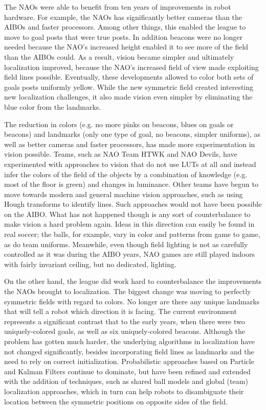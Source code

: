 \documentclass{llncs}
\begin{document}
The NAOs were able to benefit from ten years of improvements in robot hardware.
For example, the NAOs has significantly better cameras than the AIBOs and faster
processors. Among other things, this enabled the league to move to goal posts
that were true posts. In addition beacons were no longer needed because the
NAO's increased height enabled it to see more of the field than the
AIBOs could.
As a result, vision became simpler and ultimately localization improved, because
the NAO's increased field of view made exploiting field lines possible. Eventually,
these developments allowed to color both sets of goals posts uniformly yellow. While
the new symmetric field created interesting new localization challenges, it also made vision
even simpler by eliminating the blue color from the landmarks.

The reduction in colors (e.g. no more pinks on beacons, blues on goals
or beacons) and landmarks (only one type of goal, no beacons,
simpler uniforms), as well as better cameras and faster processors, has
made more experimentation in vision possible. Teams, such as
NAO Team HTWK and NAO Devils, have experimented with approaches
to vision that do not use LUTs at all and instead infer the colors of the field
of the objects by a combination of knowledge (e.g. most of the floor
is green) and changes in luminance.  Other teams have begun to move towards 
modern and general machine
vision approaches, such as using Hough transforms to identify lines. Such approaches
would not have been possible on the AIBO.
What has not happened though is any sort of counterbalance to make vision
a hard problem again. Ideas in this direction can easily be found
in real soccer; the balls, for example, vary in color and patterns from game
to game, as do team uniforms. Meanwhile, even though field lighting is not as carefully
controlled as it was during the AIBO years, NAO games are still played indoors with
fairly invariant ceiling, but no dedicated, lighting.

On the other hand, the league did work hard to counterbalance the
improvements the NAOs brought to localization. The biggest change
was moving to perfectly symmetric fields with regard to colors. No longer
are there any unique landmarks that will tell a robot which direction
it is facing. The current environment represents a significant 
contrast that to the early years, when there were two uniquely-colored
goals, as well as six uniquely-colored beacons. Although the problem has gotten
much harder, the underlying algorithms in localization have not changed significantly,
besides incorporating field lines as landmarks and the need to rely on correct initialization. 
Probabilistic approaches based on Particle and Kalman Filters continue
to dominate, but have been refined and extended with the addition of techniques, such
as shared ball models and global (team) localization approaches, which in turn can help robots to disambiguate
their location between the symmetric positions on opposite sides of the field.
\end{document}
